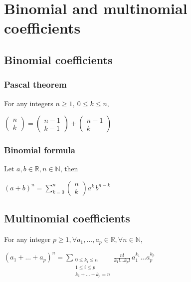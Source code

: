 \section{Binomial and multinomial coefficients}
        \subsection{Binomial coefficients}
            \subsubsection{Pascal theorem}
                For any integers $n \geq 1, \: 0 \leq k \leq n,$

                \vspace{6pt}

                \centerline{$
                    \left( \begin{array}{c} n \\ k \end{array} \right) =
                    \left( \begin{array}{c} n-1 \\ k-1 \end{array} \right) +
                    \left( \begin{array}{c} n-1 \\ k \end{array} \right)
                $}

            \subsubsection{Binomial formula}
                Let $a,b \in \mathbb{R}, n \in \mathbb{N}$, then

                \centerline{$(a+b)^n = \displaystyle\sum^n_{k=0} \left( \begin{array}{c} n \\ k \end{array} \right) a^k \, b^{n-k}$}

        \subsection{Multinomial coefficients}
            For any integer $p \geq 1, \forall a_1, ..., a_p \in \mathbb{R}, \forall n \in \mathbb{N}$,

            \vspace{6pt}
            
            \centerline{$
                (a_1+...+a_p)^n = \displaystyle\sum_{\begin{array}{c} 0\leq k_i \leq n \\ 1 \leq i \leq p \\ k_1 +...+k_p=n \end{array}}
                \frac{n!}{k_1!...k_p!} \, a_1^{k_1}...a_p^{k_p}
            $}

